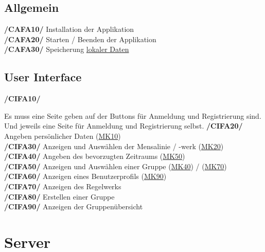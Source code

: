 \documentclass[a4paper]{scrreprt}
\begin{document}
\subsection{Allgemein}

\begin{addmargin}[25pt]{0pt} 
\textbf{/CAFA10/} Installation der Applikation \\
\textbf{/CAFA20/} Starten / Beenden der Applikation\\
\textbf{/CAFA30/} Speicherung \hyperlink{label4}{lokaler Daten}\\
\end{addmargin}

\subsection{User Interface}

\begin{addmargin}[25pt]{0pt} 
\hypertarget{cifa10}{\textbf{/CIFA10/}} Es muss eine Seite geben auf der Buttons für Anmeldung und Registrierung sind. Und jeweils eine Seite für Anmeldung und Registrierung selbst.
\hypertarget{cifa20}{\textbf{/CIFA20/}} Angeben persönlicher Daten (\hyperlink{mk10}{MK10})\\
\hypertarget{cifa30}{\textbf{/CIFA30/}} Anzeigen und Auswählen der Mensalinie / -werk (\hyperlink{mk20}{MK20})\\
\hypertarget{cifa40}{\textbf{/CIFA40/}} Angeben des bevorzugten Zeitraums (\hyperlink{mk50}{MK50})\\
\hypertarget{cifa50}{\textbf{/CIFA50/}} Anzeigen und Auswählen einer Gruppe (\hyperlink{m40}{MK40}) / (\hyperlink{mk70}{MK70})\\
\hypertarget{cifa60}{\textbf{/CIFA60/}} Anzeigen eines Benutzerprofils (\hyperlink{mk90}{MK90})\\
\hypertarget{cifa70}{\textbf{/CIFA70/}} Anzeigen des Regelwerks\\
\hypertarget{cifa80}{\textbf{/CIFA80/}} Erstellen einer Gruppe\\
\hypertarget{cifa90}{\textbf{/CIFA90/}} Anzeigen der Gruppenübersicht\\
\end{addmargin}

\section{Server}
\end{document}
